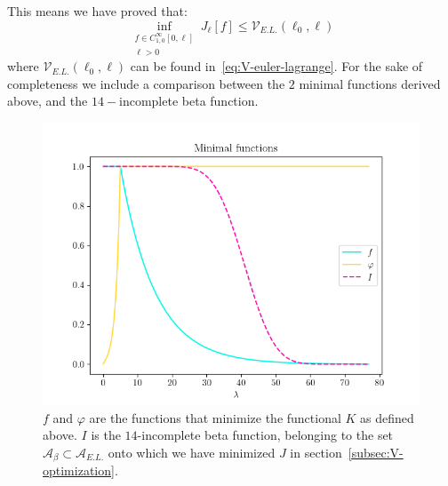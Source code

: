 This means we have proved that:
\[
    \inf_{\substack{f\in C^{\infty}_{1,0}[0, \ell]\\ \ell > 0}}J_{\ell}[f] \le \mathcal{V}_{E.L.}(\ell_0, \ell)
\]
where \(\mathcal{V}_{E.L.}(\ell_0, \ell)\) can be found in~\eqref{eq:V-euler-lagrange}. 
For the sake of completeness we include a comparison between the \(2\) minimal functions derived above, and the \(14-\)incomplete beta function.
\begin{figure}
    \includegraphics[scale=0.9]{Immagini/minimal-functions.png}
    \caption[]{\(f\) and \(\varphi\) are the functions that minimize the functional \(K\) as defined above. \(I\) is the \(14\)-incomplete beta function, belonging to the set \(\mathcal{A}_{\beta} \subset \mathcal{A}_{E.L.}\) onto which we have minimized \(J\) in section~\ref{subsec:V-optimization}.}
\end{figure}